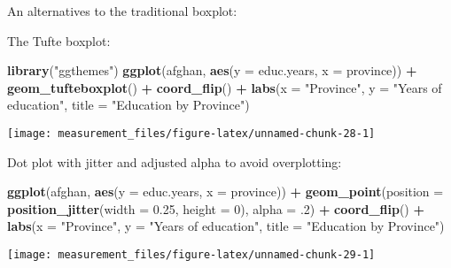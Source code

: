 \documentclass[]{book}
\newenvironment{Shaded}{\begin{snugshade}}{\end{snugshade}}
\newcommand{\KeywordTok}[1]{\textcolor[rgb]{0.13,0.29,0.53}{\textbf{#1}}}
\newcommand{\DataTypeTok}[1]{\textcolor[rgb]{0.13,0.29,0.53}{#1}}
\newcommand{\DecValTok}[1]{\textcolor[rgb]{0.00,0.00,0.81}{#1}}
\newcommand{\FloatTok}[1]{\textcolor[rgb]{0.00,0.00,0.81}{#1}}
\newcommand{\StringTok}[1]{\textcolor[rgb]{0.31,0.60,0.02}{#1}}
\newcommand{\OperatorTok}[1]{\textcolor[rgb]{0.81,0.36,0.00}{\textbf{#1}}}
\newcommand{\NormalTok}[1]{#1}
\theoremstyle{definition}
\theoremstyle{definition}
\theoremstyle{definition}
\theoremstyle{remark}
\begin{document}
An alternatives to the traditional boxplot:

The Tufte boxplot:

\begin{Shaded}
\begin{Highlighting}[]
\KeywordTok{library}\NormalTok{(}\StringTok{"ggthemes"}\NormalTok{)}
\KeywordTok{ggplot}\NormalTok{(afghan, }\KeywordTok{aes}\NormalTok{(}\DataTypeTok{y =}\NormalTok{ educ.years, }\DataTypeTok{x =}\NormalTok{ province)) }\OperatorTok{+}
\StringTok{  }\KeywordTok{geom_tufteboxplot}\NormalTok{() }\OperatorTok{+}
\StringTok{  }\KeywordTok{coord_flip}\NormalTok{() }\OperatorTok{+}
\StringTok{  }\KeywordTok{labs}\NormalTok{(}\DataTypeTok{x =} \StringTok{"Province"}\NormalTok{, }\DataTypeTok{y =} \StringTok{"Years of education"}\NormalTok{,}
       \DataTypeTok{title =} \StringTok{"Education by Province"}\NormalTok{)}
\end{Highlighting}
\end{Shaded}

\begin{center}\texttt{[image: measurement\_files/figure-latex/unnamed-chunk-28-1]} \end{center}

Dot plot with jitter and adjusted alpha to avoid overplotting:

\begin{Shaded}
\begin{Highlighting}[]
\KeywordTok{ggplot}\NormalTok{(afghan, }\KeywordTok{aes}\NormalTok{(}\DataTypeTok{y =}\NormalTok{ educ.years, }\DataTypeTok{x =}\NormalTok{ province)) }\OperatorTok{+}
\StringTok{  }\KeywordTok{geom_point}\NormalTok{(}\DataTypeTok{position =} \KeywordTok{position_jitter}\NormalTok{(}\DataTypeTok{width =} \FloatTok{0.25}\NormalTok{, }\DataTypeTok{height =} \DecValTok{0}\NormalTok{),}
             \DataTypeTok{alpha =}\NormalTok{ .}\DecValTok{2}\NormalTok{) }\OperatorTok{+}
\StringTok{  }\KeywordTok{coord_flip}\NormalTok{() }\OperatorTok{+}
\StringTok{  }\KeywordTok{labs}\NormalTok{(}\DataTypeTok{x =} \StringTok{"Province"}\NormalTok{, }\DataTypeTok{y =} \StringTok{"Years of education"}\NormalTok{,}
       \DataTypeTok{title =} \StringTok{"Education by Province"}\NormalTok{)}
\end{Highlighting}
\end{Shaded}

\begin{center}\texttt{[image: measurement\_files/figure-latex/unnamed-chunk-29-1]} \end{center}
\end{document}
